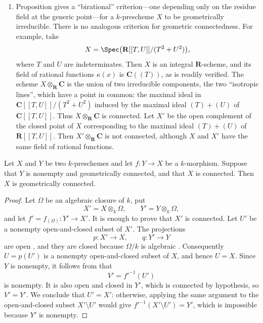 \begin{remarks}[4.5.12]
\begin{enumerate}
\item[\rm(ii)]
\label{IV.4.5.12.ii}
Proposition  gives a ``birational'' criterion---one
depending only on the residue field at the generic point---for a
$k$-prescheme $X$ to be geometrically irreducible.
There is no analogous criterion for geometric connectedness.
For example, take
\[
X=\Spec\bigl(\mathbf{R}[[T,U]]/(T^2+U^2)\bigr),
\]
where $T$ and $U$ are indeterminates.
Then $X$ is an integral $\mathbf{R}$-scheme, and its field of rational
functions $\kappa(x)$ is $\mathbf{C}((T))$, as is readily verified.
The scheme $X\otimes_{\mathbf R}\mathbf C$ is the union of two
irreducible components, the two ``isotropic lines'', which have a
point in common: the maximal ideal in
$\mathbf C[[T,U]]/(T^2+U^2)$ induced by the maximal ideal
$(T)+(U)$ of $\mathbf C[[T,U]]$.
Thus $X\otimes_{\mathbf R}\mathbf C$ is connected.
Let $X'$ be the open complement of the closed point of $X$
corresponding to the maximal ideal $(T)+(U)$ of
$\mathbf R[[T,U]]$.
Then $X'\otimes_{\mathbf R}\mathbf C$ is not connected, although $X$
and $X'$ have the same field of rational functions.
\end{enumerate}
\end{remarks}

\begin{proposition}[4.5.13]
\label{IV.4.5.13}
Let $X$ and $Y$ be two $k$-preschemes and let
$f:Y\to X$ be a $k$-morphism.
Suppose that $Y$ is nonempty and geometrically connected, and that
$X$ is connected.
Then $X$ is geometrically connected.
\end{proposition}

\begin{proof}
Let $\Omega$ be an algebraic closure of $k$, put
\[
X'=X\otimes_k\Omega,\qquad
Y'=Y\otimes_k\Omega,
\]
and let $f'=f_{(\Omega)}:Y'\to X'$.
It is enough to prove that $X'$ is connected.
Let $U'$ be a nonempty open-and-closed subset of $X'$.
The projections
\[
p:X'\longrightarrow X,\qquad q:Y'\longrightarrow Y
\]
are open , and they are closed because $\Omega/k$ is
algebraic .
Consequently $U=p(U')$ is a nonempty open-and-closed subset of $X$,
and hence $U=X$.
Since $Y$ is nonempty, it follows from  that
\[
V'=f'^{-1}(U')
\]
is nonempty.
It is also open and closed in $Y'$, which is connected by hypothesis,
so $V'=Y'$.
We conclude that $U'=X'$: otherwise, applying the same argument to
the open-and-closed subset $X'\setminus U'$ would give
$f'^{-1}(X'\setminus U')=Y'$, which is impossible because $Y'$ is
nonempty.
\end{proof}

